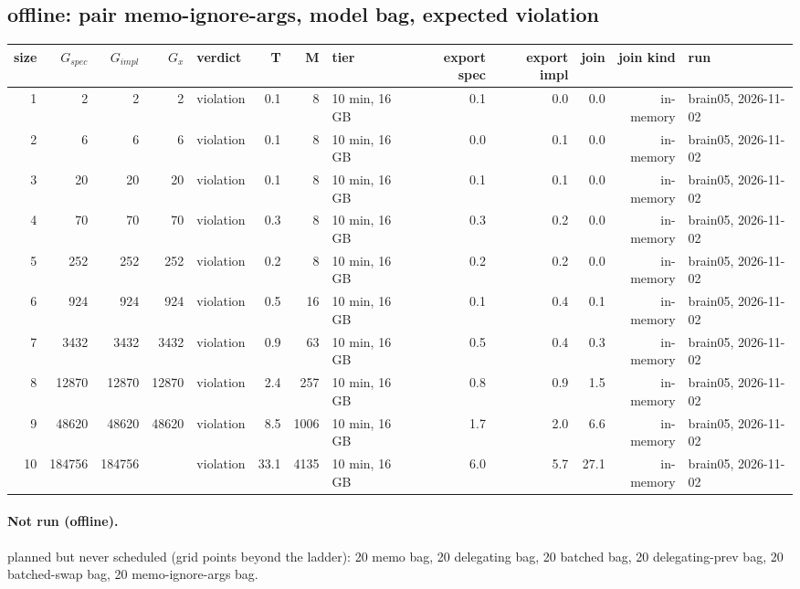 \documentclass[10pt]{article}
\begin{document}
\subsection*{offline: pair \textsf{memo-ignore-args}, model bag, expected violation}
\begin{longtable}{@{}rrrrlrrlrrrrl@{}}
\toprule
size & $G_{\mathit{spec}}$ & $G_{\mathit{impl}}$ & $G_x$ & verdict & T & M & tier & export spec & export impl & join & join kind & run \\
\midrule
\endhead
\color{red} 1 & 2 & 2 & 2 & violation & 0.1 & 8 & 10 min, 16 GB & 0.1 & 0.0 & 0.0 & in-memory & brain05, 2026-11-02 \\
\color{red} 2 & 6 & 6 & 6 & violation & 0.1 & 8 & 10 min, 16 GB & 0.0 & 0.1 & 0.0 & in-memory & brain05, 2026-11-02 \\
\color{red} 3 & 20 & 20 & 20 & violation & 0.1 & 8 & 10 min, 16 GB & 0.1 & 0.1 & 0.0 & in-memory & brain05, 2026-11-02 \\
\color{red} 4 & 70 & 70 & 70 & violation & 0.3 & 8 & 10 min, 16 GB & 0.3 & 0.2 & 0.0 & in-memory & brain05, 2026-11-02 \\
\color{red} 5 & 252 & 252 & 252 & violation & 0.2 & 8 & 10 min, 16 GB & 0.2 & 0.2 & 0.0 & in-memory & brain05, 2026-11-02 \\
\color{red} 6 & 924 & 924 & 924 & violation & 0.5 & 16 & 10 min, 16 GB & 0.1 & 0.4 & 0.1 & in-memory & brain05, 2026-11-02 \\
\color{red} 7 & 3432 & 3432 & 3432 & violation & 0.9 & 63 & 10 min, 16 GB & 0.5 & 0.4 & 0.3 & in-memory & brain05, 2026-11-02 \\
\color{red} 8 & 12870 & 12870 & 12870 & violation & 2.4 & 257 & 10 min, 16 GB & 0.8 & 0.9 & 1.5 & in-memory & brain05, 2026-11-02 \\
\color{red} 9 & 48620 & 48620 & 48620 & violation & 8.5 & 1006 & 10 min, 16 GB & 1.7 & 2.0 & 6.6 & in-memory & brain05, 2026-11-02 \\
\color{red} 10 & 184756 & 184756 &  & violation & 33.1 & 4135 & 10 min, 16 GB & 6.0 & 5.7 & 27.1 & in-memory & brain05, 2026-11-02 \\
\bottomrule
\end{longtable}
\paragraph{Not run (offline).}
planned but never scheduled (grid points beyond the ladder): 20 memo bag, 20 delegating bag, 20 batched bag, 20 delegating-prev bag, 20 batched-swap bag, 20 memo-ignore-args bag.\par
\end{document}
